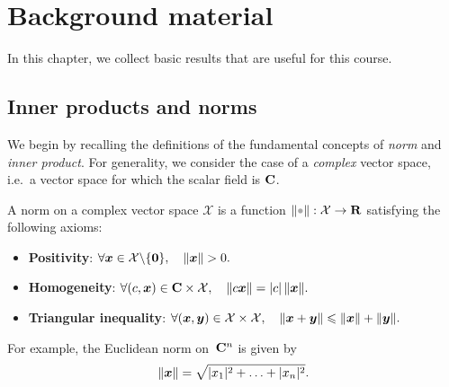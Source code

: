 \setlength{\OuterFrameSep}{0pt}

\chapter{Background material}%
\label{cha:vectors_and_matrices}
\minitoc

In this chapter,
we collect basic results that are useful for this course.

\section{Inner products and norms}%
\label{sec:inner_product_and_norm}

We begin by recalling the definitions of the fundamental concepts of \emph{norm} and \emph{inner product}.
For generality,
we consider the case of a \emph{complex} vector space,
i.e.\ a vector space for which the scalar field is $\mathbf C$.
\begin{definition}
A norm on a complex vector space $\mathcal X$ is a function $\norm{\placeholder}: \mathcal X \to \real$ satisfying the following axioms:
\begin{itemize}
    \item
        \textbf{Positivity}:
        \(
            \forall \mathbf{\boldsymbol{x}} \in \mathcal X \backslash \{\mathbf{\boldsymbol{0}}\}, \quad
            \lVert\mathbf{\boldsymbol{x}}\rVert > 0.
        \)

    \item
        \textbf{Homogeneity}:
        \(
            \forall (c, \mathbf{\boldsymbol{x}}) \in \mathbf C \times \mathcal X, \quad
            \lVert c \mathbf{\boldsymbol{x}}\rVert = \lvert c\rvert \, \lVert\mathbf{\boldsymbol{x}}\rVert .
        \)

    \item
        \textbf{Triangular inequality}:
        \(
            \forall (\mathbf{\boldsymbol{x}}, \mathbf{\boldsymbol{y}}) \in \mathcal X \times \mathcal X, \quad
            \lVert\mathbf{\boldsymbol{x}} + \mathbf{\boldsymbol{y}}\rVert \leqslant \lVert\mathbf{\boldsymbol{x}}\rVert + \lVert\mathbf{\boldsymbol{y}}\rVert.
        \)
\end{itemize}
\end{definition}
For example,
the Euclidean norm on~$\mathbf C^n$ is given by
\[
    \lVert\mathbf{\boldsymbol{x}}\rVert = \sqrt{\lvert x_1 \rvert^2 + \dotsc + \lvert x_n \rvert^2}.
\]

